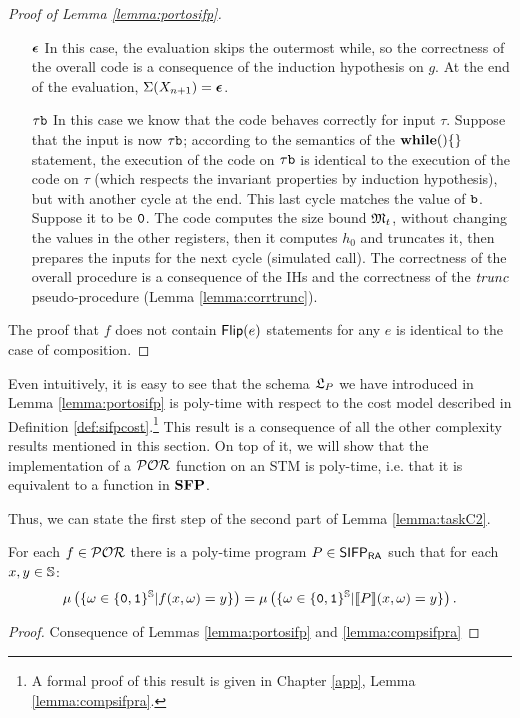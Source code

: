 \begin{proof}[Proof of Lemma \ref{lemma:portosifp}]
\begin{itemize}
  \item [$\bm{\epsilon}$] In this case, the evaluation skips the outermost while, so the
  correctness of the overall code is a consequence of the induction hypothesis on
  $g$. At the end of the evaluation, $\Sigma(X_{n+1})=\bm{\epsilon}$.
  \item [$\tau\mathtt{b}$] In this case we know that the code behaves correctly for input
  $\tau$. Suppose that the input is now $\tau\mathtt{b}$; according to the semantics of
  the $\mathbf{while}()\{\}$ statement, the execution of the code on $\tau\mathtt{b}$ is identical
  to the execution of the code on $\tau$ (which respects the invariant properties
  by induction hypothesis), but with another cycle at the end. This last cycle matches the
  value of $\mathtt{b}$. Suppose it to be $\mathtt{0}$. The code computes the size bound $\mathfrak M_t$,
  without changing the values in the other registers, then it computes $h_0$ and
  truncates it, then prepares the inputs for the next cycle (simulated call).
  The correctness of the overall procedure is a consequence
  of the IHs and the correctness of the $\mathit{trunc}$ pseudo-procedure
  (Lemma \ref{lemma:corrtrunc}).
\end{itemize}
The proof that $f$ does not contain $\mathsf{Flip(}e\mathsf{)}$ statements for any $e$ is identical
to the case of composition.
\end{proof}

Even intuitively, it is easy to see that the schema ${\mathfrak L_{P}}$ we have introduced
in Lemma \ref{lemma:portosifp} is poly-time with respect to the cost model described
in Definition \ref{def:sifpcost}.\footnote{A formal proof of this result is given in
Chapter \ref{app}, Lemma \ref{lemma:compsifpra}.} This result is a consequence of
all the other complexity results mentioned in this section. On top of it,
we will show that the implementation of a $\mathcal{POR}$ function on an STM
is poly-time, i.e. that it is equivalent to a function in $\mathbf{SFP}$.
%

Thus, we can state the first step of the second part of Lemma \ref{lemma:taskC2}.

\begin{cor}
 \label{cor:PORtoSIFPRA}
 For each $f \in \mathcal{POR}$ there is a poly-time program  $P \in \mathsf{SIFP_{{\mathsf{RA}}}}$ such that for each $x, y \in \mathbb{S}$:
 $$
 \mu\left(\{\omega \in \{\mathtt{0}, \mathtt{1} \}^{\mathbb{S}} | f(x, \omega)=y\}\right)=\mu\left(\{\omega \in \{\mathtt{0}, \mathtt{1} \}^{\mathbb{S}} | \llbracket P\rrbracket(x, \omega)=y\}\right).
 $$
\end{cor}
\begin{proof}
  Consequence of Lemmas \ref{lemma:portosifp} and \ref{lemma:compsifpra}
\end{proof}

